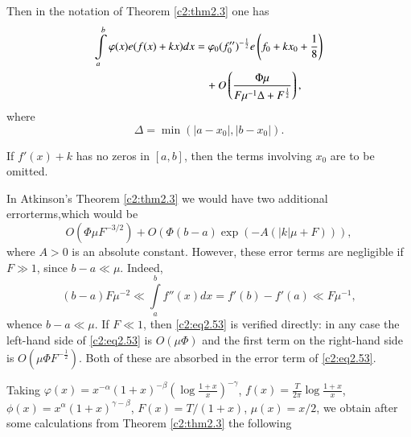 Then in the notation of Theorem \ref{c2:thm2.3} one has
\begin{align}
  \int\limits_a^b \varphi (x) e (f(x) + kx)dx &= \varphi_0 (f''_0)^{-
    \frac{1}{2}} e\left(f_0 + kx_0 + \frac{1}{8}\right)\notag\\
&\quad + O\left(\frac{\Phi \mu}{F \mu^{-1} \Delta  + F^{\frac{1}{2}}} 
  \right),\label{c2:eq2.53} 
\end{align}
where
$$
\Delta  = \min (|a- x_0|, |b- x_0|).
$$

If $f' (x)+k$ has no zeros in $[a, b]$, then the terms involving $x_0$
are to be omitted.

In Atkinson's Theorem \ref{c2:thm2.3} we would have two additional
error\break terms,\pageoriginale which would be
$$
O (\Phi \mu F^{- 3/2}) + O (\Phi (b-a) \exp (-A (|k|\mu + F))),
$$
where $A > 0$ is an absolute constant. However, these error terms are
negligible if $F \gg 1$, since $b-a \ll \mu$. Indeed,
$$
(b-a) F\mu^{-2} \ll \int\limits_a^b f'' (x) dx = f' (b) - f'(a) \ll
F\mu^{-1}, 
$$
whence $b-a \ll \mu$. If $F \ll 1$, then \eqref{c2:eq2.53} is verified
directly: in any case the left-hand side of \eqref{c2:eq2.53} is
$O(\mu \Phi)$ and the first term on the right-hand side is $O (\mu
\Phi F^{- \frac{1}{2}})$. Both of these are absorbed in the error term
of \eqref{c2:eq2.53}.

Taking $\varphi (x) = x^{-\alpha} (1+ x)^{- \beta} \left(\log \frac{1+x}{x} \right)^{-\gamma}$, $f(x) =
\frac{T}{2\pi} \log \frac{1+x}{x}$, $\phi (x) = x^\alpha (1+x)^{\gamma - \beta}$, $F(x) = T / (1+x)$, $\mu (x) = x/2$,  we obtain after some calculations from
Theorem \ref{c2:thm2.3} the  following

